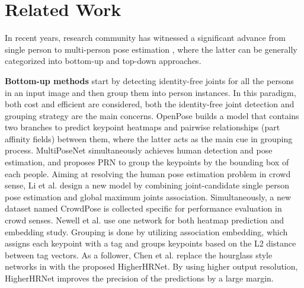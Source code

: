 \documentclass[10pt,journal,compsoc]{IEEEtran}
\begin{document}
\section{Related Work}
\label{sec:RW}
In recent years, research community has witnessed a significant advance from single person \cite{MPII, IEF,PS,ConvNetPOSE,DPM,DeepPose,tompson2014joint,CPM,Hourglass,fppose} to multi-person pose estimation \cite{jin2020whole,COCO,iqbal2016multi,DeepCut,DeeperCut,OpenPose,G-RMI,nie2019single,CPN,HRNet,AssociativeEmbedding,OccNet,Higher}, where the latter can be generally categorized into bottom-up \cite{DeepCut,DeeperCut,OpenPose,AssociativeEmbedding,PersonLab,Higher} and top-down  \cite{G-RMI,CPN,MSPN,CFA,Mask-RCNN,OccNet,SBNet,HRNet} approaches.

\textbf{Bottom-up methods} start by detecting identity-free joints for all the persons in an input image and then group them into person instances. In this paradigm, both cost and efficient are considered, both the identity-free joint detection and grouping strategy are the main concerns. OpenPose \cite{OpenPose} builds a model that contains two branches to predict keypoint heatmaps and pairwise relationships (part affinity fields) between them, where the latter acts as the main cue in grouping process. MultiPoseNet \cite{MultiPoseNet} simultaneously achieves human detection and pose estimation, and proposes PRN to group the keypoints by the bounding box of each people. Aiming at resolving the human pose estimation problem in crowd sense, Li et al. \cite{Crowdpose} design a new model by combining joint-candidate single person pose estimation and global maximum joints association. Simultaneously, a new dataset named CrowdPose is collected specific for performance evaluation in crowd senses. Newell et al. \cite{AssociativeEmbedding} use one network for both heatmap prediction and embedding study. Grouping is done by utilizing association embedding, which assigns each keypoint with a tag and groups keypoints based on the L2 distance between tag vectors. As a follower, Chen et al. \cite{Higher} replace the hourglass style networks in \cite{AssociativeEmbedding} with the proposed HigherHRNet. By using higher output resolution, HigherHRNet improves the precision of the predictions by a large margin.
\end{document}
